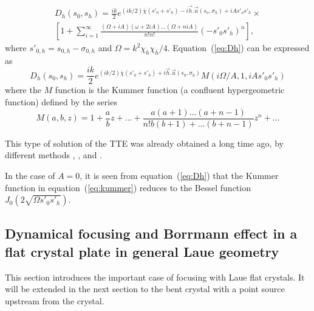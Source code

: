 \documentclass[preprint]{iucr}              %
\newcommand{\inblue}[1]{{\color{blue}#1}}
\newcommand{\inred}[1]{{\color{red}#1}}
\begin{document}
\begin{multline}
\label{eq:Dh}
    D_h(s_0,s_h) = \frac{i k}{2} e^{(ik/2) \bar \chi (s'_0 + s'_h) - i\vec h.\vec u(s_o,\sigma_h)+i A s'_o s'_h } \times
    \\
    [1 + \sum_{i=1}^\infty \frac{(\Omega + i A )(\omega+2iA)...(\Omega+niA)}{n!n!}(-s'_0s'_h)^n],
\end{multline}
where $s'_{0,h}=s_{0,h}-\sigma_{0,h}$ and $\Omega = k^2 \chi_h \chi_{\bar h}/4$. Equation~(\ref{eq:Dh}) can be expressed as
\begin{equation}
\label{eq:kummer}
    D_h(s_0,s_h) = \frac{i k }{2} e^{(ik/2) \bar \chi (s'_0 + s'_h) + i \vec h . \vec u (s_0,\sigma_h)} M(i\Omega/A,1,iA s'_0 s'_h)
\end{equation}
where the $M$ function is the Kummer function (a confluent hypergeometric function) defined by the series
\begin{equation}
\label{eq:kummerSeries}
    M(a,b,z) = 1 + \frac{a}{b} z + 
    ... + \frac{a(a+1)...(a+n-1)}{n! b (b+1)+...(b+n-1)}z^n+...
\end{equation}

This type of solution of the TTE was already obtained a long time ago, by different methods \cite{Petrashen1974}, \cite{Katagawa1974}, \cite{Litzmann1974} and \cite{Chukhovski1977}.


In the case of $A=0$, it is seen from equation~(\ref{eq:Dh}) that the Kummer function in equation~(\ref{eq:kummer}) reduces to the Bessel function $J_0(2\sqrt{\Omega s'_0 s'_h})$. 
          
\subsection{Dynamical focusing and Borrmann effect in a flat crystal plate in general Laue geometry}
\label{sec:LaueFlat}

\inblue{This section introduces the important case of focusing with Laue flat crystals. It will be extended in the next section to the bent crystal with a point source upstream from the crystal.}
\end{document}

